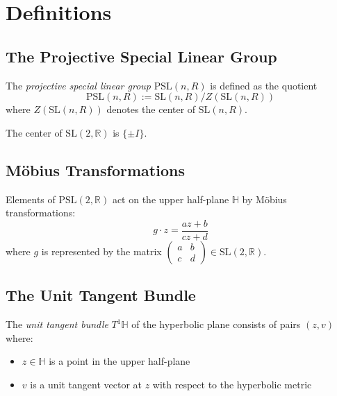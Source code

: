 \chapter{Definitions}

\section{The Projective Special Linear Group}

\begin{definition}
\label{def:PSL}
\leanok
The \emph{projective special linear group} $\mathrm{PSL}(n,R)$ is defined as the quotient
\[ \mathrm{PSL}(n,R) := \mathrm{SL}(n,R) / Z(\mathrm{SL}(n,R)) \]
where $Z(\mathrm{SL}(n,R))$ denotes the center of $\mathrm{SL}(n,R)$.
\end{definition}

\begin{lemma}
\label{lem:center_sl2r}
The center of $\mathrm{SL}(2,\mathbb{R})$ is $\{\pm I\}$.
\end{lemma}

\section{Möbius Transformations}

\begin{definition}
\label{def:moebius_action}
\leanok
{}
Elements of $\mathrm{PSL}(2,\mathbb{R})$ act on the upper half-plane $\mathbb{H}$ by Möbius transformations:
\[ g \cdot z = \frac{az + b}{cz + d} \]
where $g$ is represented by the matrix $\begin{pmatrix} a & b \\ c & d \end{pmatrix} \in \mathrm{SL}(2,\mathbb{R})$.
\end{definition}

\section{The Unit Tangent Bundle}

\begin{definition}
\label{def:unit_tangent_bundle}
\leanok
The \emph{unit tangent bundle} $T^1\mathbb{H}$ of the hyperbolic plane consists of pairs $(z, v)$ where:
\begin{itemize}
\item $z \in \mathbb{H}$ is a point in the upper half-plane
\item $v$ is a unit tangent vector at $z$ with respect to the hyperbolic metric
\end{itemize}
\end{definition}

